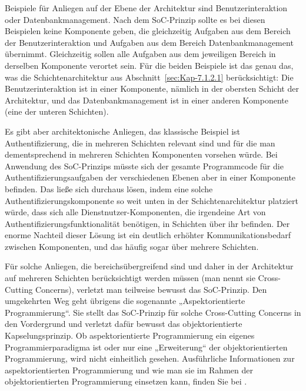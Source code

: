 \vspace{0.8mm} %

Beispiele für Anliegen auf der Ebene der Architektur sind Benutzerinteraktion oder Datenbankmanagement. Nach dem SoC-Prinzip sollte es bei diesen Beispielen keine Komponente geben, die gleichzeitig Aufgaben aus dem Bereich der Benutzer\-inter\-aktion und Aufgaben aus dem Bereich Datenbankmanagement übernimmt. Gleichzeitig sollen alle Aufgaben aus dem jeweiligen Bereich in derselben Komponente verortet sein. Für die beiden Beispiele ist das genau das, was die Schichtenarchitektur aus Abschnitt~\ref{sec:Kap-7.1.2.1} berücksichtigt: Die Benutzerinteraktion ist in einer Komponente, nämlich in der obersten Schicht der Architektur, und das Datenbankmanagement ist in einer anderen Komponente (eine der unteren Schichten). 

\vspace{0.8mm} %

Es gibt aber architektonische Anliegen, das klassische Beispiel ist Authentifizierung, die in mehreren Schichten relevant sind und für die man dementsprechend in mehreren Schichten Komponenten vorsehen würde. Bei Anwendung des SoC-Prinzips müsste sich der gesamte Programmcode für die Authentifizierungsaufgaben der verschiedenen Ebenen aber in einer Komponente befinden. Das ließe sich durchaus lösen, indem eine solche Authentifizierungskomponente so weit unten in der Schichten\-architektur platziert würde, dass sich alle Dienstnutzer-Komponenten, die irgendeine Art von Authentifizierungsfunktionalität benötigen, in Schichten über ihr befinden. Der enorme Nachteil dieser Lösung ist ein deutlich erhöhter Kommunikationsbedarf zwischen Komponenten, und das häufig sogar über mehrere Schichten. 

\vspace{0.8mm} %

Für solche Anliegen, die bereichsübergreifend sind und daher in der Architektur auf mehreren Schichten berücksichtigt werden müssen (man nennt sie 
Cross-Cutting Concerns), verletzt man teilweise bewusst das SoC-Prinzip. Den umgekehrten Weg geht übrigens die sogenannte „Aspektorientierte Programmierung“. Sie stellt das SoC-Prinzip für solche Cross-Cutting Concerns in den Vordergrund und verletzt dafür bewusst das objekt\-orientierte Kapselungsprinzip. Ob aspektorientierte Programmierung ein eigenes Programmierparadigma ist oder nur eine „Erweiterung“ der objektorientierten Programmierung, wird nicht einheitlich gesehen. Ausführliche Informationen zur aspektorientierten Programmierung und wie man sie im Rahmen der objektorientierten Programmierung einsetzen kann, finden Sie bei \cite[533-578]{lah18}. 

